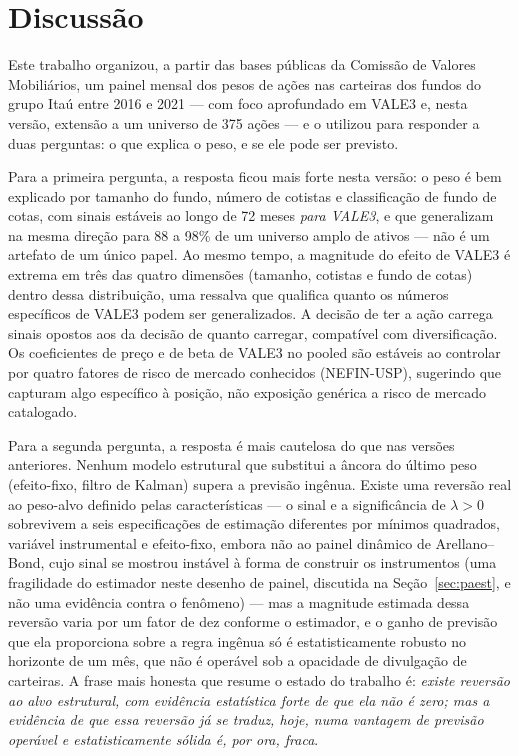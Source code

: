 \documentclass[12pt,a4paper]{article}
\begin{document}
\section{Discussão}
\label{sec:disc}

Este trabalho organizou, a partir das bases públicas da Comissão de Valores Mobiliários, um
painel mensal dos pesos de ações nas carteiras dos fundos do grupo Itaú entre 2016 e 2021 --- com
foco aprofundado em VALE3 e, nesta versão, extensão a um universo de 375 ações --- e o
utilizou para responder a duas perguntas: o que explica o peso, e se ele pode ser previsto.

Para a primeira pergunta, a resposta ficou mais forte nesta versão: o peso é bem explicado por
tamanho do fundo, número de cotistas e classificação de fundo de cotas, com sinais estáveis ao
longo de 72 meses \emph{para VALE3}, e que generalizam na mesma direção para 88 a 98\% de um
universo amplo de ativos --- não é um artefato de um único papel. Ao mesmo tempo, a magnitude do
efeito de VALE3 é extrema em três das quatro dimensões (tamanho, cotistas e fundo de cotas) dentro
dessa distribuição, uma ressalva que qualifica quanto os números específicos de VALE3 podem ser
generalizados. A decisão de ter a
ação carrega sinais opostos aos da decisão de quanto carregar, compatível com diversificação. Os
coeficientes de preço e de beta de VALE3 no pooled são estáveis ao controlar por quatro fatores
de risco de mercado conhecidos (NEFIN-USP), sugerindo que capturam algo específico à posição, não
exposição genérica a risco de mercado catalogado.

Para a segunda pergunta, a resposta é mais cautelosa do que nas versões anteriores. Nenhum
modelo estrutural que substitui a âncora do último peso (efeito-fixo, filtro de Kalman) supera a
previsão ingênua. Existe uma reversão real ao peso-alvo definido pelas características --- o
sinal e a significância de $\lambda>0$ sobrevivem a seis especificações de estimação diferentes
por mínimos quadrados, variável instrumental e efeito-fixo, embora não ao painel dinâmico de
Arellano--Bond, cujo sinal se mostrou instável à forma de construir os instrumentos (uma
fragilidade do estimador neste desenho de painel, discutida na Seção~\ref{sec:paest}, e não uma
evidência contra o fenômeno) --- mas a magnitude estimada dessa reversão varia por um fator de
dez conforme o estimador, e o ganho de previsão que ela proporciona sobre a regra ingênua só é
estatisticamente robusto no horizonte de um mês, que não é operável sob a opacidade de divulgação
de carteiras. A frase mais honesta que resume o estado do trabalho é:
\emph{existe reversão ao alvo estrutural, com evidência estatística forte de que ela não é zero;
mas a evidência de que essa reversão já se traduz, hoje, numa vantagem de previsão operável e
estatisticamente sólida é, por ora, fraca}.
\end{document}
